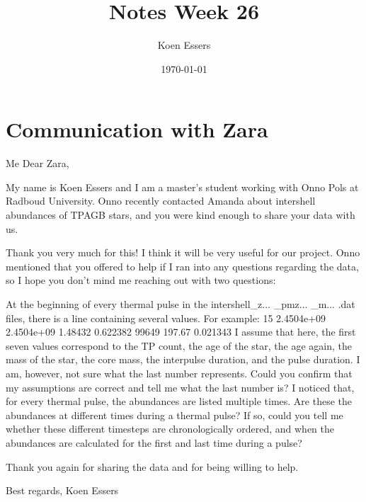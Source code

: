 \documentclass[a4paper,10pt]{article}
\title{Notes Week 26}
\author{Koen Essers}
\date{\today}
\begin{document}
\setuplayout

\section{Communication with Zara}

\begin{minipage}{1.55\textwidth}
\begin{shadequote}{Me}
Dear Zara,

My name is Koen Essers and I am a master's student working with Onno Pols at Radboud University. Onno recently contacted Amanda about intershell abundances of TPAGB stars, and you were kind enough to share your data with us.

Thank you very much for this! I think it will be very useful for our project. Onno mentioned that you offered to help if I ran into any questions regarding the data, so I hope you don't mind me reaching out with two questions:

    At the beginning of every thermal pulse in the intershell\_z... \_pmz... \_m... .dat files, there is a line containing several values. For example:
    15 2.4504e+09 2.4504e+09 1.48432 0.622382 99649 197.67 0.021343
    I assume that here, the first seven values correspond to the TP count, the age of the star, the age again, the mass of the star, the core mass, the interpulse duration, and the pulse duration. I am, however, not sure what the last number represents. Could you confirm that my assumptions are correct and tell me what the last number is?
    I noticed that, for every thermal pulse, the abundances are listed multiple times. Are these the abundances at different times during a thermal pulse? If so, could you tell me whether these different timesteps are chronologically ordered, and when the abundances are calculated for the first and last time during a pulse?


Thank you again for sharing the data and for being willing to help.

Best regards,
Koen Essers
\end{shadequote}
\end{minipage}
\end{document}
